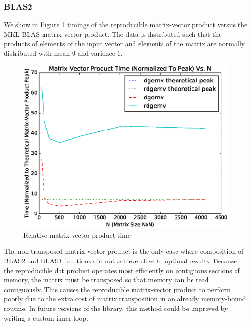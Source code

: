   \subsubsection{BLAS2}
    We show in Figure \ref{fig:gemv_timings} timings of the reproducible matrix-vector product versus the MKL BLAS matrix-vector product. The data is distributed such that the products of elements of the input vector and elements of the matrix are normally distributed with mean $0$ and variance $1$.
  \begin{figure}[H]
  \begin{center}
  \includegraphics[width=\textwidth]{plots/gemv_comparison}
  \caption{Relative matrix-vector product time}
  \label{fig:gemv_timings}
  \end{center}
  \end{figure}
  The non-transposed matrix-vector product is the only case where composition of BLAS2 and BLAS3 functions did not achieve close to optimal results. Because the reproducible dot product operates most efficiently on contiguous sections of memory, the matrix must be transposed so that memory can be read contiguously. This causes the reproducible matrix-vector product to perform poorly due to the extra cost of matrix transposition in an already memory-bound routine. In future versions of the library, this method could be improved by writing a custom inner-loop.

